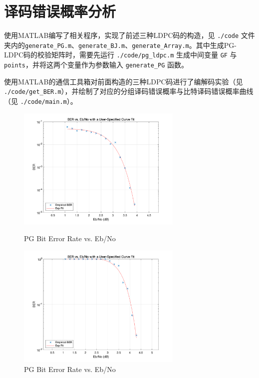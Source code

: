 \documentclass[lang=cn,11pt,a4paper,numbers]{elegantpaper}
\begin{document}
\section{译码错误概率分析}

使用MATLAB编写了相关程序，实现了前述三种LDPC码的构造，见 \lstinline{./code} 文件夹内的\lstinline{generate_PG.m}、\lstinline{generate_BJ.m}、\lstinline{generate_Array.m}。其中生成PG-LDPC码的校验矩阵时，需要先运行 \lstinline{./code/pg_ldpc.m} 生成中间变量 \lstinline{GF} 与 \lstinline{points}，并将这两个变量作为参数输入 \lstinline{generate_PG} 函数。

使用MATLAB的通信工具箱对前面构造的三种LDPC码进行了编解码实验（见 \lstinline{./code/get_BER.m}），并绘制了对应的分组译码错误概率与比特译码错误概率曲线（见 \lstinline{./code/main.m}）。

\begin{figure}[htbp]
\begin{minipage}[t]{0.5\linewidth}
\centering
\includegraphics[width=3.1in]{figure/pg_bit_er.png}
\caption{PG Bit Error Rate vs. Eb/No}
\label{fig:pg_bit_er}
\end{minipage}%
\begin{minipage}[t]{0.5\linewidth}
\centering
\includegraphics[width=3.1in]{figure/pg_block_er.png}
\caption{PG Bit Error Rate vs. Eb/No}
\label{fig:pg_block_er}
\end{minipage}
\end{figure}
\end{document}
